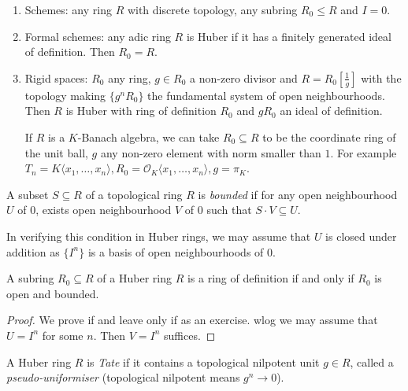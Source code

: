 \documentclass[a4paper]{article}
\renewcommand*{\O}{\mathcal{O}}
\begin{document}
\begin{eg}\leavevmode
  \begin{enumerate}
  \item Schemes: any ring \(R\) with discrete topology, any subring \(R_0 \leq R\) and \(I = 0\).
  \item Formal schemes: any adic ring \(R\) is Huber if it has a finitely generated ideal of definition. Then \(R_0 = R\).
  \item Rigid spaces: \(R_0\) any ring, \(g \in R_0\) a non-zero divisor and \(R = R_0[\frac{1}{g}]\) with the topology making \(\{g^nR_0\}\) the fundamental system of open neighbourhoods. Then \(R\) is Huber with ring of definition \(R_0\) and \(gR_0\) an ideal of definition.

    If \(R\) is a \(K\)-Banach algebra, we can take \(R_0 \subseteq R\) to be the coordinate ring of the unit ball, \(g\) any non-zero element with norm smaller than \(1\). For example \(T_n = K\langle x_1, \dots, x_n\rangle, R_0 = \O_K\langle x_1, \dots, x_n\rangle, g = \pi_K\).
  \end{enumerate}
\end{eg}

\begin{definition}
  A subset \(S \subseteq R\) of a topological ring \(R\) is \emph{bounded} if for any open neighbourhood \(U\) of \(0\), exists open neighbourhood \(V\) of \(0\) such that \(S \cdot V \subseteq U\).
\end{definition}

\begin{remark}
  In verifying this condition in Huber rings, we may assume that \(U\) is closed under addition as \(\{I^n\}\) is a basis of open neighbourhoods of \(0\).
\end{remark}

\begin{lemma}
  A subring \(R_0 \subseteq R\) of a Huber ring \(R\) is a ring of definition if and only if \(R_0\) is open and bounded.
\end{lemma}

\begin{proof}
  We prove if and leave only if as an exercise. wlog we may assume that \(U = I^n\) for some \(n\). Then \(V = I^n\) suffices.
\end{proof}

\begin{definition}
  A Huber ring \(R\) is \emph{Tate} if it contains a topological nilpotent unit \(g \in R\), called a \emph{pseudo-uniformiser} (topological nilpotent means \(g^n \to 0\)).
\end{definition}
\end{document}
